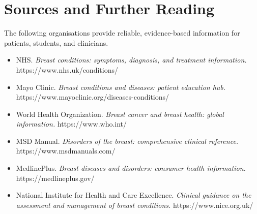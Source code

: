 \section*{Sources and Further Reading}
The following organisations provide reliable, evidence-based information for patients, students, and clinicians.

\begin{itemize}
    \item NHS. \textit{Breast conditions: symptoms, diagnosis, and treatment information.} https://www.nhs.uk/conditions/
    \item Mayo Clinic. \textit{Breast conditions and diseases: patient education hub.} https://www.mayoclinic.org/diseases-conditions/
    \item World Health Organization. \textit{Breast cancer and breast health: global information.} https://www.who.int/
    \item MSD Manual. \textit{Disorders of the breast: comprehensive clinical reference.} https://www.msdmanuals.com/
    \item MedlinePlus. \textit{Breast diseases and disorders: consumer health information.} https://medlineplus.gov/
    \item National Institute for Health and Care Excellence. \textit{Clinical guidance on the assessment and management of breast conditions.} https://www.nice.org.uk/
\end{itemize}
